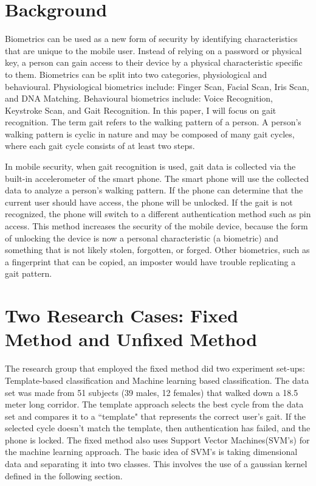 \documentclass{sig-alternate}
\begin{document}
\section{Background}
	Biometrics can be used as a new form of security by identifying characteristics that are unique to the mobile user. Instead of relying on a password or physical key, a person can gain access to their device by a physical characteristic specific to them. Biometrics can be split into two categories, physiological and behavioural. Physiological biometrics include: Finger Scan, Facial Scan, Iris Scan, and DNA Matching. Behavioural biometrics include: Voice Recognition, Keystroke Scan, and Gait Recognition. In this paper, I will focus on gait recognition. The term gait refers to the walking pattern of a person. A person's walking pattern is cyclic in nature and may be composed of many gait cycles, where each gait cycle consists of at least two steps.~\cite{Sujithra:2012} 
	
	In mobile security, when gait recognition is used, gait data is collected via the built-in accelerometer of the smart phone. The smart phone will use the collected data to analyze a person's walking pattern. If the phone can determine that the current user should have access, the phone will be unlocked. If the gait is not recognized, the phone will switch to a different authentication method such as pin access. This method increases the security of the mobile device, because the form of unlocking the device is now a personal characteristic (a biometric) and something that is not likely stolen, forgotten, or forged. Other biometrics, such as a fingerprint that can be copied, an imposter would have trouble replicating a gait pattern.



\section{Two Research Cases: Fixed \\ Method and Unfixed Method}
	The research group that employed the fixed method did two experiment set-ups: Template-based classification and Machine learning based classification. The data set was made from 51 subjects (39 males, 12 females) that walked down a 18.5 meter long corridor. The template approach selects the best cycle from the data set and compares it to a ``template" that represents the correct user's gait. If the selected cycle doesn't match the template, then authentication has failed, and the phone is locked.  The fixed method also uses Support Vector Machines(SVM's) for the machine learning approach. The basic idea of SVM's is taking dimensional data and separating it into two classes. This involves the use of a gaussian kernel defined in the following section.
	
\end{document}
